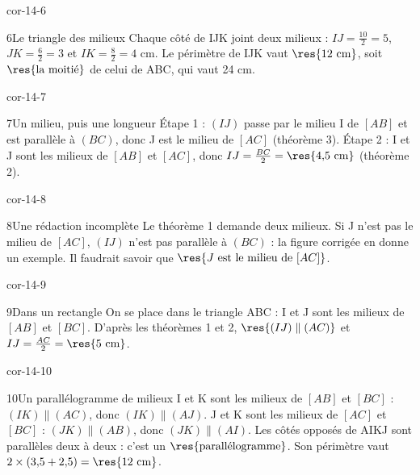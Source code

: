 \begin{blocLivre}{cor-14-6}\begin{corrige}{6}{Le triangle des milieux}
Chaque côté de IJK joint deux milieux : $IJ=\frac{10}2=5$, $JK=\frac62=3$ et $IK=\frac82=4$ cm. Le périmètre de IJK vaut $\res{12\ \mathrm{cm}}$, soit $\res{\text{la moitié}}$ de celui de ABC, qui vaut 24 cm.
\label{fig-cor-14-6}
\end{corrige}\end{blocLivre}
\begin{blocLivre}{cor-14-7}\begin{corrige}{7}{Un milieu, puis une longueur}
Étape 1 : $(IJ)$ passe par le milieu I de $[AB]$ et est parallèle à $(BC)$, donc J est le milieu de $[AC]$ (théorème 3). Étape 2 : I et J sont les milieux de $[AB]$ et $[AC]$, donc $IJ=\frac{BC}2=\res{4{,}5\ \mathrm{cm}}$ (théorème 2).
\label{fig-cor-14-7}
\end{corrige}\end{blocLivre}
\begin{blocLivre}{cor-14-8}\begin{corrige}{8}{Une rédaction incomplète}
Le théorème 1 demande deux milieux. Si J n’est pas le milieu de $[AC]$, $(IJ)$ n’est pas parallèle à $(BC)$ : la figure corrigée en donne un exemple. Il faudrait savoir que $\res{J\text{ est le milieu de }[AC]}$.
\label{fig-cor-14-8}
\end{corrige}\end{blocLivre}
\begin{blocLivre}{cor-14-9}\begin{corrige}{9}{Dans un rectangle}
On se place dans le triangle ABC : I et J sont les milieux de $[AB]$ et $[BC]$. D’après les théorèmes 1 et 2, $\res{(IJ)\parallel(AC)}$ et $IJ=\frac{AC}2=\res{5\ \mathrm{cm}}$.
\label{fig-cor-14-9}
\end{corrige}\end{blocLivre}
\begin{blocLivre}{cor-14-10}\begin{corrige}{10}{Un parallélogramme de milieux}
I et K sont les milieux de $[AB]$ et $[BC]$ : $(IK)\parallel(AC)$, donc $(IK)\parallel(AJ)$. J et K sont les milieux de $[AC]$ et $[BC]$ : $(JK)\parallel(AB)$, donc $(JK)\parallel(AI)$. Les côtés opposés de AIKJ sont parallèles deux à deux : c’est un $\res{\text{parallélogramme}}$. Son périmètre vaut $2\times(3{,}5+2{,}5)=\res{12\ \mathrm{cm}}$.
\label{fig-cor-14-10}
\end{corrige}\end{blocLivre}
